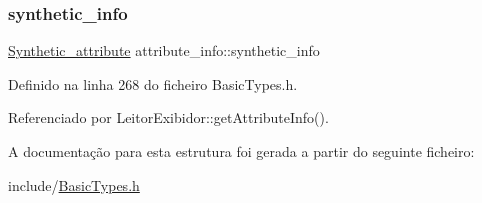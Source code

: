 \subsubsection{\texorpdfstring{synthetic\+\_\+info}{synthetic\_info}}
{\footnotesize\ttfamily \hyperlink{structSynthetic__attribute}{Synthetic\+\_\+attribute} attribute\+\_\+info\+::synthetic\+\_\+info}



Definido na linha 268 do ficheiro Basic\+Types.\+h.



Referenciado por Leitor\+Exibidor\+::get\+Attribute\+Info().



A documentação para esta estrutura foi gerada a partir do seguinte ficheiro\+:\begin{DoxyCompactItemize}
\item 
include/\hyperlink{BasicTypes_8h}{Basic\+Types.\+h}\end{DoxyCompactItemize}
